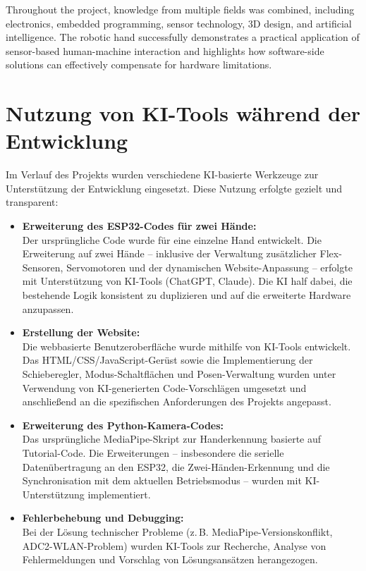 \documentclass[12pt,a4paper]{article}
\begin{document}
Throughout the project, knowledge from multiple fields was combined, including electronics, embedded programming, sensor technology, 3D design, and artificial intelligence. The robotic hand successfully demonstrates a practical application of sensor-based human-machine interaction and highlights how software-side solutions can effectively compensate for hardware limitations.
\newpage
\section{Nutzung von KI-Tools während der Entwicklung}

Im Verlauf des Projekts wurden verschiedene KI-basierte Werkzeuge zur Unterstützung 
der Entwicklung eingesetzt. Diese Nutzung erfolgte gezielt und transparent:

\begin{itemize}[itemsep=4pt]
    \item \textbf{Erweiterung des ESP32-Codes für zwei Hände:} \\
    Der ursprüngliche Code wurde für eine einzelne Hand entwickelt. Die Erweiterung 
    auf zwei Hände -- inklusive der Verwaltung zusätzlicher Flex-Sensoren, Servomotoren 
    und der dynamischen Website-Anpassung -- erfolgte mit Unterstützung von KI-Tools 
    (ChatGPT, Claude). Die KI half dabei, die bestehende Logik konsistent zu duplizieren 
    und auf die erweiterte Hardware anzupassen.

    \item \textbf{Erstellung der Website:} \\
    Die webbasierte Benutzeroberfläche wurde mithilfe von KI-Tools entwickelt. Das 
    HTML/CSS/JavaScript-Gerüst sowie die Implementierung der Schieberegler, 
    Modus-Schaltflächen und Posen-Verwaltung wurden unter Verwendung von KI-generierten 
    Code-Vorschlägen umgesetzt und anschließend an die spezifischen Anforderungen des 
    Projekts angepasst.

    \item \textbf{Erweiterung des Python-Kamera-Codes:} \\
    Das ursprüngliche MediaPipe-Skript zur Handerkennung basierte auf Tutorial-Code. 
    Die Erweiterungen -- insbesondere die serielle Datenübertragung an den ESP32, die 
    Zwei-Händen-Erkennung und die Synchronisation mit dem aktuellen Betriebsmodus -- 
    wurden mit KI-Unterstützung implementiert.

    \item \textbf{Fehlerbehebung und Debugging:} \\
    Bei der Lösung technischer Probleme (z.\,B. MediaPipe-Versionskonflikt, ADC2-WLAN-Problem) 
    wurden KI-Tools zur Recherche, Analyse von Fehlermeldungen und Vorschlag von 
    Lösungsansätzen herangezogen.
\end{itemize}
\end{document}
